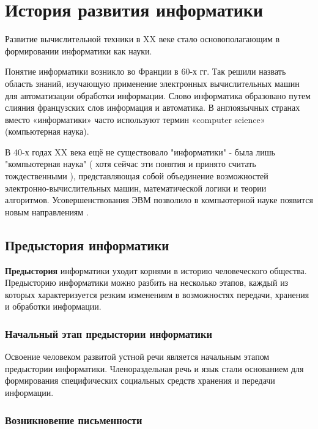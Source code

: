 \chapter{История развития информатики} \label{chapt1}

Развитие вычислительной техники в XX веке стало основополагающим в  формировании информатики как науки.

Понятие информатики возникло  во Франции в 60-х гг. Так решили назвать область знаний, изучающую применение электронных вычислительных машин для автоматизации обработки информации. Слово информатика образовано путем слияния французских слов информация и автоматика. В англоязычных странах вместо «информатики» часто используют термин «computer science» (компьютерная наука).

В 40-х годах XX века ещё не существовало "информатики" - была лишь "компьютерная наука" ( хотя сейчас эти понятия и принято считать тождественными ), представляющая собой объединение возможностей электронно-вычислительных машин, математической логики и теории алгоритмов. Усовершенствования ЭВМ позволило в компьютерной науке появится новым направлениям \cite{bib102}.


\section{Предыстория информатики} \label{sect1_1}

\textbf{Предыстория} информатики уходит корнями в историю человеческого общества. Предысторию информатики можно разбить на несколько этапов, каждый из которых характеризуется резким изменениям в возможностях передачи, хранения и обработки информации.

\subsection{Начальный этап предыстории информатики} \label{subsect1_1_1}

Освоение человеком развитой устной речи является начальным этапом предыстории информатики. Членораздельная речь и язык стали основанием для формирования специфических социальных средств хранения и передачи информации. 

\subsection{Возникновение письменности} \label{subsect1_1_2}

